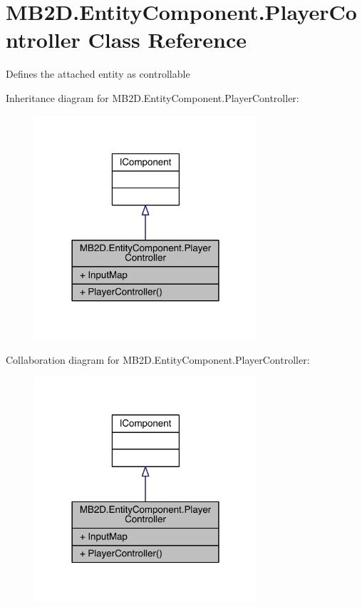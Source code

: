 \hypertarget{class_m_b2_d_1_1_entity_component_1_1_player_controller}{}\section{M\+B2\+D.\+Entity\+Component.\+Player\+Controller Class Reference}
\label{class_m_b2_d_1_1_entity_component_1_1_player_controller}


Defines the attached entity as controllable  




Inheritance diagram for M\+B2\+D.\+Entity\+Component.\+Player\+Controller\+:
\nopagebreak
\begin{figure}[H]
\begin{center}
\leavevmode
\includegraphics[width=234pt]{class_m_b2_d_1_1_entity_component_1_1_player_controller__inherit__graph}
\end{center}
\end{figure}


Collaboration diagram for M\+B2\+D.\+Entity\+Component.\+Player\+Controller\+:
\nopagebreak
\begin{figure}[H]
\begin{center}
\leavevmode
\includegraphics[width=234pt]{class_m_b2_d_1_1_entity_component_1_1_player_controller__coll__graph}
\end{center}
\end{figure}
